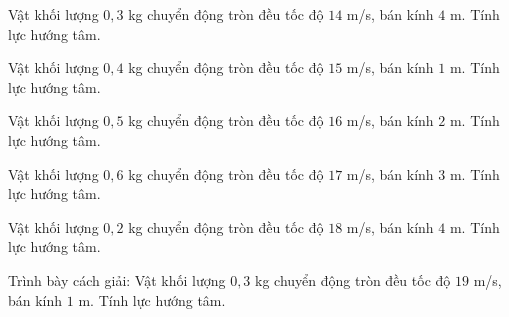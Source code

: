 \begin{ex}
Vật khối lượng $0,3$ kg chuyển động tròn đều tốc độ $14$ m/s, bán kính $4$ m. Tính lực hướng tâm.
\end{ex}

\begin{ex}
Vật khối lượng $0,4$ kg chuyển động tròn đều tốc độ $15$ m/s, bán kính $1$ m. Tính lực hướng tâm.
\end{ex}

\begin{ex}
Vật khối lượng $0,5$ kg chuyển động tròn đều tốc độ $16$ m/s, bán kính $2$ m. Tính lực hướng tâm.
\end{ex}

\begin{ex}
Vật khối lượng $0,6$ kg chuyển động tròn đều tốc độ $17$ m/s, bán kính $3$ m. Tính lực hướng tâm.
\end{ex}

\begin{ex}
Vật khối lượng $0,2$ kg chuyển động tròn đều tốc độ $18$ m/s, bán kính $4$ m. Tính lực hướng tâm.
\end{ex}

\begin{bt}
Trình bày cách giải: Vật khối lượng $0,3$ kg chuyển động tròn đều tốc độ $19$ m/s, bán kính $1$ m. Tính lực hướng tâm.
\end{bt}


